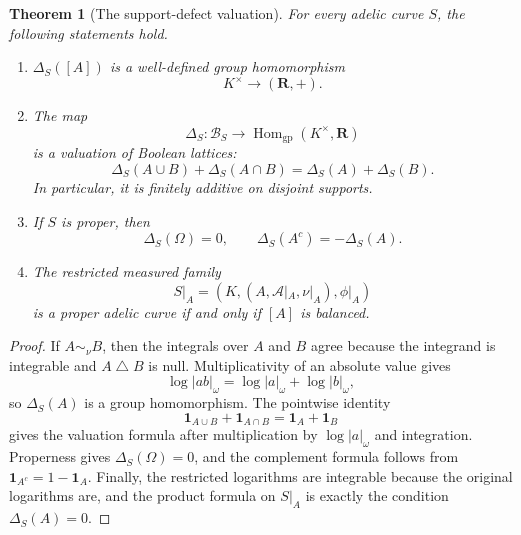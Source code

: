 \documentclass[11pt]{amsart}
\numberwithin{equation}{section}
\newtheorem{theorem}{Theorem}[section]
\theoremstyle{definition}
\newcommand{\R}{\mathbf R}
\begin{document}
\begin{theorem}[The support-defect valuation]
\label{thm:adelic-support-defect}
For every adelic curve $S$, the following statements hold.
\begin{enumerate}[label=\textup{(\arabic*)}]
\item $\Delta_S([A])$ is a well-defined group homomorphism
\[
K^\times\longrightarrow(\R,+).
\]
\item The map
\[
\Delta_S:\mathscr B_S\longrightarrow
\operatorname{Hom}_{\mathrm{gp}}(K^\times,\R)
\]
is a valuation of Boolean lattices:
\[
\Delta_S(A\cup B)+\Delta_S(A\cap B)
=\Delta_S(A)+\Delta_S(B).
\]
In particular, it is finitely additive on disjoint supports.
\item If $S$ is proper, then
\[
\Delta_S(\Omega)=0,
\qquad
\Delta_S(A^c)=-\Delta_S(A).
\]
\item The restricted measured family
\[
S|_A=(K,(A,\mathcal A|_A,\nu|_A),\phi|_A)
\]
is a proper adelic curve if and only if $[A]$ is balanced.
\end{enumerate}
\end{theorem}

\begin{proof}
If $A\sim_\nu B$, then the integrals over $A$ and $B$ agree because the
integrand is integrable and $A\mathbin\triangle B$ is null.  Multiplicativity
of an absolute value gives
\[
\log|ab|_\omega=\log|a|_\omega+\log|b|_\omega,
\]
so $\Delta_S(A)$ is a group homomorphism.  The pointwise identity
\[
\mathbf 1_{A\cup B}+\mathbf 1_{A\cap B}
=\mathbf 1_A+\mathbf 1_B
\]
gives the valuation formula after multiplication by
$\log|a|_\omega$ and integration.  Properness gives
$\Delta_S(\Omega)=0$, and the complement formula follows from
$\mathbf 1_{A^c}=1-\mathbf 1_A$.  Finally, the restricted logarithms are
integrable because the original logarithms are, and the product formula on
$S|_A$ is exactly the condition $\Delta_S(A)=0$.
\end{proof}
\end{document}
